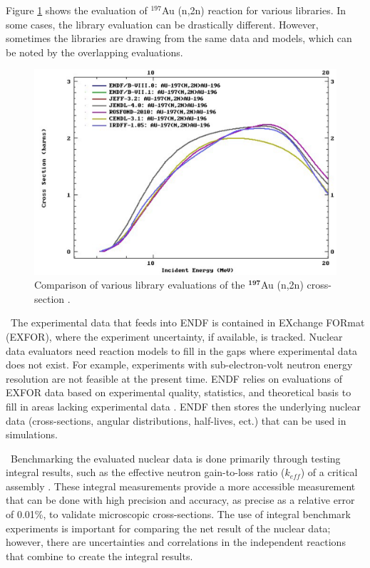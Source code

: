 Figure \ref{fig:RxnComp} shows the evaluation of $^{197}$Au (n,2n) reaction for various libraries. 
In some cases, the library evaluation can be drastically different. 
However, sometimes the libraries are drawing from the same data and models, which can be noted by the overlapping evaluations. 

\begin{figure}[ht]
	\includegraphics[width=\linewidth]{Figures/Chapter2/RxnComp.png}
	\caption[Comparison of various library evaluations of the  $^{197}$Au (n,2n) cross-section.]{Comparison of various library evaluations of the $\mathbf{^{197}}$Au (n,2n) cross-section \cite{ENDF}.}
	\label{fig:RxnComp}
\end{figure}

\ The experimental data that feeds into ENDF is contained in EXchange FORmat (EXFOR), where the experiment uncertainty, if available, is tracked.
Nuclear data evaluators need reaction models to fill in the gaps where experimental data does not exist.  For example, experiments with sub-electron-volt neutron energy resolution are not feasible at the present time. 
ENDF relies on evaluations of EXFOR data based on experimental quality, statistics, and theoretical basis to fill in areas lacking experimental data \cite{Brown2015}. 
ENDF then stores the underlying nuclear data (cross-sections, angular distributions, half-lives, ect.) that can be used in simulations. 

\ Benchmarking the evaluated nuclear data is done primarily through testing integral results, such as the effective neutron gain-to-loss ratio ($k_{eff}$) of a critical assembly \cite{Brown2015}. These integral measurements provide a more accessible measurement that can be done with high precision and accuracy, as precise as a relative error of 0.01\%, to validate microscopic cross-sections. The use of integral benchmark experiments is important for comparing the net result of the nuclear data; however, there are uncertainties and correlations in the independent reactions that combine to create the integral results. 

